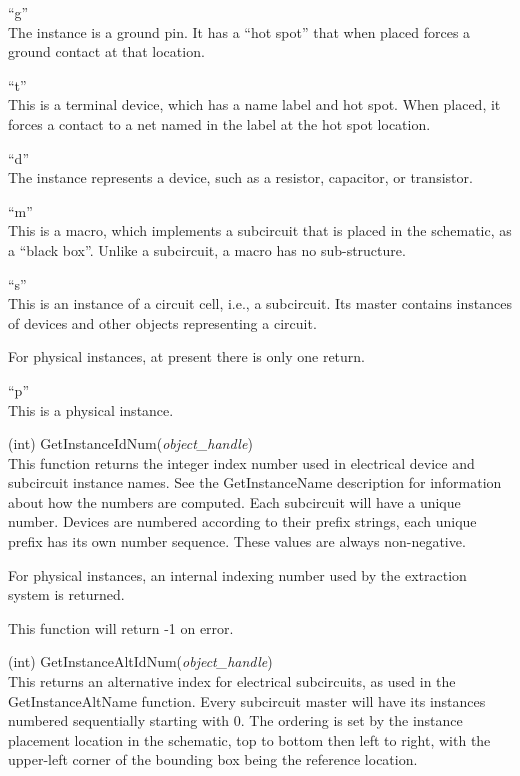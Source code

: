\begin{description}
\begin{description}
\item{``g''}\\
The instance is a ground pin.  It has a ``hot spot'' that when placed
forces a ground contact at that location.

\item{``t''}\\
This is a terminal device, which has a name label and hot spot.  When
placed, it forces a contact to a net named in the label at the hot
spot location.

\item{``d''}\\
The instance represents a device, such as a resistor, capacitor, or
transistor.

\item{``m''}\\
This is a macro, which implements a subcircuit that is placed in the
schematic, as a ``black box''.  Unlike a subcircuit, a macro has no
sub-structure.

\item{``s''}\\
This is an instance of a circuit cell, i.e., a subcircuit.  Its master
contains instances of devices and other objects representing a
circuit.
\end{description}

For physical instances, at present there is only one return.
\begin{description}
\item{``p''}\\
   This is a physical instance.
\end{description}

\item{(int) \vt GetInstanceIdNum({\it object\_handle\/})}\\
This function returns the integer index number used in electrical
device and subcircuit instance names.  See the {\vt GetInstanceName}
description for information about how the numbers are computed.  Each
subcircuit will have a unique number.  Devices are numbered according
to their prefix strings, each unique prefix has its own number
sequence.  These values are always non-negative.

For physical instances, an internal indexing number used by the
extraction system is returned.

This function will return -1 on error.

\item{(int) \vt GetInstanceAltIdNum({\it object\_handle\/})}\\
This returns an alternative index for electrical subcircuits, as used
in the {\vt GetInstanceAltName} function.  Every subcircuit master
will have its instances numbered sequentially starting with 0.  The
ordering is set by the instance placement location in the schematic,
top to bottom then left to right, with the upper-left corner of the
bounding box being the reference location.


\end{description}
